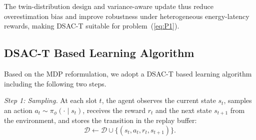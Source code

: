 \documentclass[conference]{IEEEtran}
\begin{document}
The twin-distribution design and variance-aware update thus reduce overestimation bias and improve robustness under heterogeneous energy-latency rewards, making DSAC-T suitable for problem~(\ref{eq:P1}).

\subsection{DSAC-T Based Learning Algorithm}

Based on the MDP reformulation, we adopt a DSAC-T based learning algorithm including the following two steps.

\textit{Step 1: Sampling.}  
At each slot $t$, the agent observes the current state $s_t$, samples an action $a_t\sim\pi_\phi(\cdot\mid s_t)$, receives the reward $r_t$ and the next state $s_{t+1}$ from the environment, and stores the transition in the replay buffer:
\begin{equation}
\mathcal{D}
\leftarrow
\mathcal{D}\cup\{(s_t,a_t,r_t,s_{t+1})\}.
\end{equation}
\end{document}
